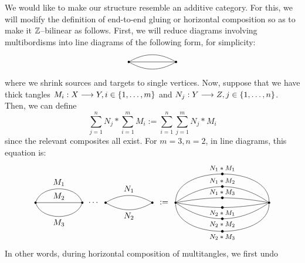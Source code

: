 \documentclass{amsart}
\newcommand{\Z}[1][]{\ifthenelse{\equal{#1}{}}{\mathbb{Z}}
                                              {\mathbb{Z}/#1\mathbb{Z}}}
\renewcommand{\to}[1][]{\stackrel{#1}{\longrightarrow}}
\newcommand{\curly}[1]{\left\{ #1 \right\}}
\newcommand{\set}[2][]{\ifthenelse{\equal{#1}{}}
                                  {\curly{#2}}
                                  {\curly{#1\ \textbf{:}\ #2}}}
\newcommand{\vertinnersep}{1pt}
\newcommand{\colvert}[3]{
\node[circle, fill, inner sep=\vertinnersep, #1] at (#2) (#3) {};
}
\newcommand{\lblvert}[3]{
\node at (#1) (#2) {#3};
}
\numberwithin{thm}{section}
\theoremstyle{definition}
\begin{document}
We would like to make our structure resemble an additive category. For this, we
will modify the definition of end-to-end gluing or horizontal composition so as
to make it $\Z$--bilinear as follows. First, we will reduce diagrams involving
multibordisms into line diagrams of the following form, for simplicity:
\[\begin{tikzpicture}
\colvert{black}{1, 0}{s}
\colvert{black}{3, 0}{t}
\path
  (s) edge[bend left] (t)
  (s) edge (t)
  (s) edge[bend right] (t)
  ;
\end{tikzpicture}\]
where we shrink sources and targets to single vertices. Now, suppose that we
have thick tangles $M_i : X \to Y, i \in \set{1, \dots, m}$ and
$N_j : Y \to Z, j \in \set{1, \dots, n}$. Then, we can define
\[
  \sum_{j = 1}^n N_j * \sum_{i = 1}^m M_i
  := \sum_{i = 1}^n \sum_{j = 1}^m N_j * M_i
\]
since the relevant composites all exist. For $m = 3, n =2$, in line diagrams,
this equation is:
\[\begin{tikzpicture}
\colvert{black}{1, 0}{X}
\colvert{black}{3, 0}{Y}
\lblvert{3.5, 0}{glue}{$\cdots$}
\colvert{black}{4, 0}{YY}
\colvert{black}{6, 0}{Z}
\path
  (X)  edge[bend left=70]   node[above]{$M_1$}   (Y)
  (X)  edge                 node[above]{$M_2$}   (Y)
  (X)  edge[bend right=70]  node[below]{$M_3$}   (Y)
  (YY) edge[bend left]      node[above]{$N_1$}   (Z)
  (YY) edge[bend right]     node[below]{$N_2$}   (Z)
  ;
\lblvert{6.5, 0}{equals}{$:=$}
\colvert{black}{7, 0}{XX}
\colvert{black}{11, 0}{ZZ}
\draw
  (XX) to[bend left=90]
  node[midway, draw=black, fill=black, shape=circle, inner sep=\vertinnersep]{}
  node[midway, above]{{\footnotesize $N_1 * M_1$}}
  (ZZ);
\draw
  (XX) to[bend left=35]
  node[midway, draw=black, fill=black, shape=circle, inner sep=\vertinnersep]{}
  node[midway, above]{{\footnotesize $N_1 * M_2$}}
  (ZZ);
\draw
  (XX) to[bend left=10]
  node[midway, draw=black, fill=black, shape=circle, inner sep=\vertinnersep]{}
  node[midway, above]{{\footnotesize $N_1 * M_3$}}
  (ZZ);
\draw
  (XX) to[bend right=10]
  node[midway, draw=black, fill=black, shape=circle, inner sep=\vertinnersep]{}
  node[midway, below]{{\footnotesize $N_2 * M_1$}}
  (ZZ);
\draw
  (XX) to[bend right=35]
  node[midway, draw=black, fill=black, shape=circle, inner sep=\vertinnersep]{}
  node[midway, below]{{\footnotesize $N_2 * M_2$}}
  (ZZ);
\draw
  (XX) to[bend right=90]
  node[midway, draw=black, fill=black, shape=circle, inner sep=\vertinnersep]{}
  node[midway, below]{{\footnotesize $N_2 * M_3$}}
  (ZZ);
\end{tikzpicture}\]
In other words, during horizontal composition of multitangles, we first undo
\end{document}
